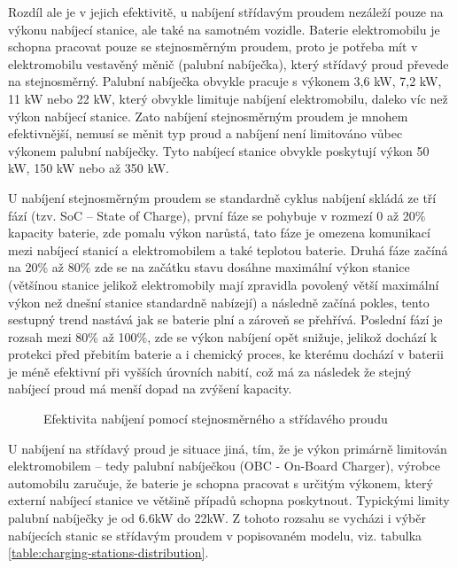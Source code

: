 \documentclass[a4paper,11pt]{article}
\begin{document}
Rozdíl ale je v jejich efektivitě, u nabíjení střídavým proudem nezáleží pouze na výkonu nabíjecí stanice, 
ale také na samotném vozidle. Baterie elektromobilu je schopna pracovat pouze se stejnosměrným proudem, 
proto je potřeba mít v elektromobilu vestavěný měnič (palubní nabíječka), který střídavý proud převede 
na stejnosměrný. Palubní nabíječka obvykle pracuje s výkonem 3,6 kW, 7,2 kW, 11 kW nebo 22 kW,
který obvykle limituje nabíjení elektromobilu, daleko víc než výkon nabíjecí stanice. \cite{nabijeni_ev}
Zato nabíjení stejnosměrným proudem je mnohem efektivnější, nemusí se měnit typ proud a nabíjení není limitováno
vůbec výkonem palubní nabíječky. Tyto nabíjecí stanice obvykle poskytují výkon 50 kW, 150 kW nebo až 350 kW.\cite{nabijeni_ev, data_brno}

U nabíjení stejnosměrným proudem se standardně cyklus nabíjení skládá ze tří fází (tzv. SoC -- State of Charge), první
fáze se pohybuje v rozmezí 0 až 20\% kapacity baterie, zde pomalu výkon narůstá, tato fáze je omezena komunikací
mezi nabíjecí stanicí a elektromobilem a také teplotou baterie. Druhá fáze začíná na 20\% až 80\% zde se na začátku
stavu dosáhne maximální výkon stanice (většínou stanice jelikož elektromobily mají zpravidla povolený větší maximální výkon
než dnešní stanice standardně nabízejí) a následně začíná pokles, tento sestupný trend nastává jak se baterie plní a
zároveň se přehřívá. Poslední fází je rozsah mezi 80\% až 100\%, zde se výkon nabíjení opět snižuje, jelikož
dochází k protekci před přebitím baterie a i chemický proces, ke kterému dochází v baterii je méně efektivní 
při vyšších úrovních nabití, což má za následek že stejný nabíjecí proud má menší dopad na zvýšení kapacity. \cite{nabijeci_krivka}

\begin{figure}[H]
    \centering
    \caption{Efektivita nabíjení pomocí stejnosměrného a střídavého proudu \cite{rozdil_mezi_ac_dc_nabijenim_graf}}
    \label{figure:ac-dc-charging-efficency}
\end{figure}

U nabíjení na střídavý proud je situace jiná, tím, že je výkon primárně limitován elektromobilem -- tedy palubní nabíječkou 
(OBC - On-Board Charger), výrobce automobilu zaručuje, že baterie je schopna pracovat s určitým výkonem, který externí
nabíjecí stanice ve většině případů schopna poskytnout. Typickými limity palubní nabíječky je od 6.6kW do 22kW. \cite{we_power_your_car_obc} 
Z tohoto rozsahu se vycházi i výběr nabíjecích stanic se střídavým proudem v popisovaném modelu, viz. tabulka \ref{table:charging-stations-distribution}.
\end{document}
